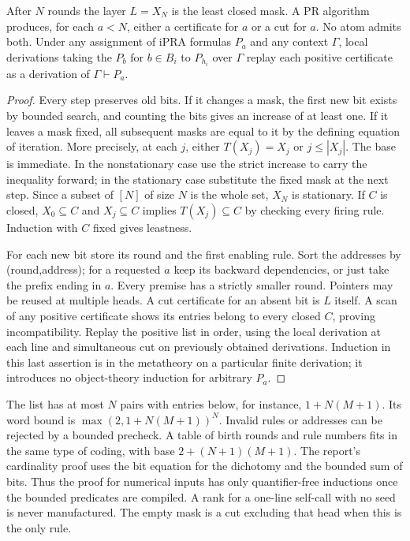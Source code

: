 \begin{theorem}\label{th:closure}
After $N$ rounds the layer $L=X_N$ is the least closed mask. A PR algorithm produces, for each $a<N$, either a certificate for $a$ or a cut for $a$. No atom admits both. Under any assignment of iPRA formulas $P_a$ and any context $\Gamma$, local derivations taking the $P_b$ for $b\in B_i$ to $P_{h_i}$ over $\Gamma$ replay each positive certificate as a derivation of $\Gamma\vdash P_a$.
\end{theorem}
\begin{proof}
Every step preserves old bits. If it changes a mask, the first new bit exists by bounded search, and counting the bits gives an increase of at least one. If it leaves a mask fixed, all subsequent masks are equal to it by the defining equation of iteration. More precisely, at each $j$, either $T(X_j)=X_j$ or $j\le |X_j|$. The base is immediate. In the nonstationary case use the strict increase to carry the inequality forward; in the stationary case substitute the fixed mask at the next step. Since a subset of $[N]$ of size $N$ is the whole set, $X_N$ is stationary. If $C$ is closed, $X_0\subseteq C$ and $X_j\subseteq C$ implies $T(X_j)\subseteq C$ by checking every firing rule. Induction with $C$ fixed gives leastness.

For each new bit store its round and the first enabling rule. Sort the addresses by (round,address); for a requested $a$ keep its backward dependencies, or just take the prefix ending in $a$. Every premise has a strictly smaller round. Pointers may be reused at multiple heads. A cut certificate for an absent bit is $L$ itself. A scan of any positive certificate shows its entries belong to every closed $C$, proving incompatibility. Replay the positive list in order, using the local derivation at each line and simultaneous cut on previously obtained derivations. Induction in this last assertion is in the metatheory on a particular finite derivation; it introduces no object-theory induction for arbitrary $P_a$.
\end{proof}

The list has at most $N$ pairs with entries below, for instance, $1+N(M+1)$. Its word bound is $\max(2,1+N(M+1))^N$. Invalid rules or addresses can be rejected by a bounded precheck. A table of birth rounds and rule numbers fits in the same type of coding, with base $2+(N+1)(M+1)$. The report's cardinality proof uses the bit equation for the dichotomy and the bounded sum of bits. Thus the proof for numerical inputs has only quantifier-free inductions once the bounded predicates are compiled. A rank for a one-line self-call with no seed is never manufactured. The empty mask is a cut excluding that head when this is the only rule.

